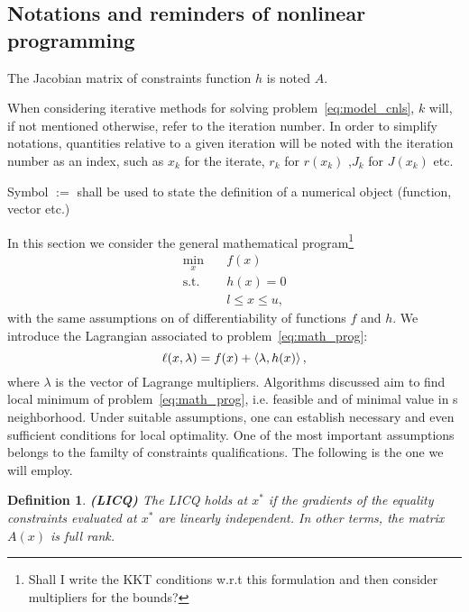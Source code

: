 \documentclass[10pt]{article}
\newtheorem{definition}[theorem]{Definition}
\numberwithin{equation}{section}
\begin{document}
	\subsection{Notations and reminders of nonlinear programming}
	
	The Jacobian matrix of constraints function $h$ is noted $A$.
	
	When considering iterative methods for solving problem~\eqref{eq:model_cnls}, $k$ will, if not mentioned otherwise, refer to the iteration number. In order to simplify notations, quantities relative to a given iteration will be noted with the iteration number as an index, such as $x_k$ for the iterate, $r_k$ for $r(x_k)$ ,$J_k$ for $J(x_k)$ etc.
	
	Symbol $:=$ shall be used to state the definition of a numerical object (function, vector etc.)
	
	In this section we consider the general mathematical program\footnote{Shall I write the KKT conditions w.r.t this formulation and then consider multipliers for the bounds?}
	\begin{equation}
		\label{eq:math_prog}
		\begin{aligned}
			\min_x \quad & f(x) \\
			\text{s.t.} \quad & h(x)=0 \\
			& l \le x \le u,
		\end{aligned}
	\end{equation}
	with the same assumptions on of differentiability of functions $f$ and \(h\). We introduce the Lagrangian associated to problem~\eqref{eq:math_prog}:
	\begin{equation}
		\label{eq:lagrangian}
		\ell(x,\lambda) = f(x) + \left\langle {\lambda} , {h(x)} \right\rangle,
	\end{equation}
	where $\lambda$ is the vector of Lagrange multipliers. Algorithms discussed aim to find local minimum of problem~\eqref{eq:math_prog}, i.e. feasible and of minimal value in s neighborhood. Under suitable assumptions, one can establish necessary and even sufficient conditions for local optimality. One of the most important assumptions belongs to the familty of constraints qualifications. The following is the one we will employ.
	
	\begin{definition}\label{def:licq}
		\textbf{(LICQ)}
		The LICQ holds at $x^*$ if the gradients of the equality constraints evaluated at $x^*$ are linearly independent. In other terms, the matrix $A(x)$ is full rank.
	\end{definition}
	
\end{document}
